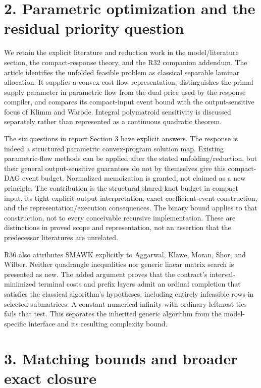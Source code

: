 \documentclass[11pt,letterpaper]{article}
\begin{document}
\section*{2. Parametric optimization and the residual priority question}

We retain the explicit literature and reduction work in the model/literature section, the compact-response theory, and the R32 companion addendum. The article identifies the unfolded feasible problem as classical separable laminar allocation. It supplies a convex-cost-flow representation, distinguishes the primal supply parameter in parametric flow from the dual price used by the response compiler, and compares its compact-input event bound with the output-sensitive focus of Klimm and Warode. Integral polymatroid sensitivity is discussed separately rather than represented as a continuous quadratic theorem.


The six questions in report Section 3 have explicit answers. The response is indeed a structured parametric convex-program solution map. Existing parametric-flow methods can be applied after the stated unfolding/reduction, but their general output-sensitive guarantees do not by themselves give this compact-DAG event budget. Normalized memoization is granted, not claimed as a new principle. The contribution is the structural shared-knot budget in compact input, its tight explicit-output interpretation, exact coefficient-event construction, and the representation/execution consequences. The binary bound applies to that construction, not to every conceivable recursive implementation. These are distinctions in proved scope and representation, not an assertion that the predecessor literatures are unrelated.


R36 also attributes SMAWK explicitly to Aggarwal, Klawe, Moran, Shor, and Wilber. Neither quadrangle inequalities nor generic linear matrix search is presented as new. The added argument proves that the contract's interval-minimized terminal costs and prefix layers admit an ordinal completion that satisfies the classical algorithm's hypotheses, including entirely infeasible rows in selected submatrices. A constant numerical infinity with ordinary leftmost ties fails that test. This separates the inherited generic algorithm from the model-specific interface and its resulting complexity bound.


\section*{3. Matching bounds and broader exact closure}
\end{document}
